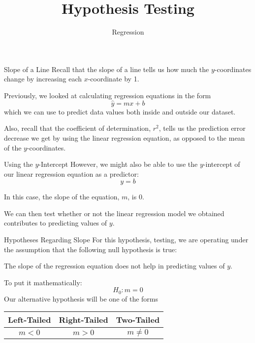 \documentclass[t]{beamer}
\title{Hypothesis Testing}
\subtitle{Regression}
\author{}
\date{}
\begin{document}

\begin{frame} 
\maketitle
\end{frame}

\begin{frame}{Slope of a Line}
Recall that the slope of a line tells us how much the $y$-coordinates change by increasing each $x$-coordinate by 1.	\newline\\	\pause

Previously, we looked at calculating regression equations in the form
\[
\hat {y} = mx + b
\]
\newline
which we can use to predict data values both inside and outside our dataset.	\newline\\	\pause

Also, recall that the coefficient of determination, $r^2$, tells us the prediction error decrease we get by using the linear regression equation, as opposed to the mean of the $y$-coordinates.
\end{frame}

\begin{frame}{Using the $y$-Intercept}
However, we might also be able to use the $y$-intercept of our linear regression equation as a predictor:
\[ y = b\]	\pause

In this case, the slope of the equation, $m$, is 0. \newline\\	\pause

We can then test whether or not the linear regression model we obtained contributes to predicting values of $y$.
\end{frame}

\begin{frame}{Hypotheses Regarding Slope}
For this hypothesis, testing, we are operating under the assumption that the following null hypothesis is true:
\begin{center}
The slope of the regression equation does not help in predicting values of $y$.
\end{center}	\pause
To put it mathematically:
\[
H_0: m = 0
\]
\pause
Our alternative hypothesis will be one of the forms
\begin{center}
\begin{tabular}{|c|c|c|}
\hline
\textbf{Left-Tailed} & \textbf{Right-Tailed} & \textbf{Two-Tailed}  \\ \hline 
$m < 0$ & $m > 0$ & $m \neq 0$ \\ \hline
\end{tabular}
\end{center}
\end{frame}
\end{document}
